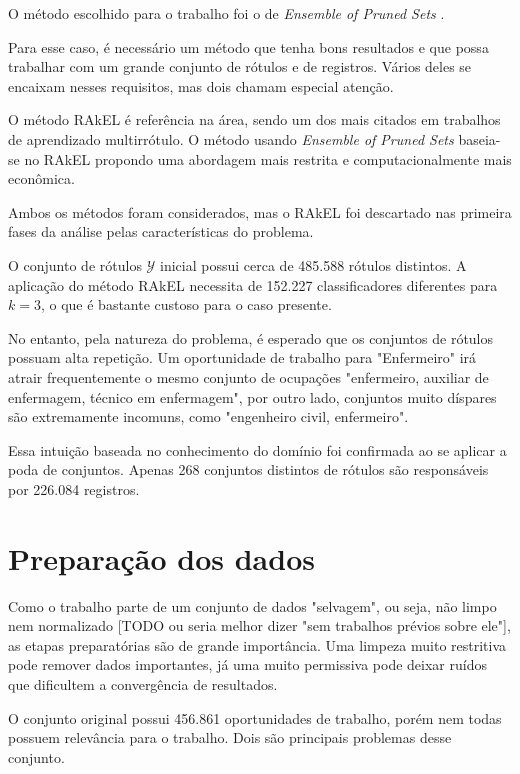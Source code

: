 \documentclass[runningheads,a4paper]{llncs}
\begin{document}
O método escolhido para o trabalho foi o de \textit{Ensemble of Pruned Sets} \cite{Read2008-bt}.

Para esse caso, é necessário um método que tenha bons resultados e que possa trabalhar com um grande conjunto de rótulos e de registros. Vários deles se encaixam nesses requisitos, mas dois chamam especial atenção.

O método RAkEL \cite{Tsoumakas2007-wm} é referência na área, sendo um dos mais citados em trabalhos de aprendizado multirrótulo. O método usando \textit{Ensemble of Pruned Sets} baseia-se no RAkEL propondo uma abordagem mais restrita e computacionalmente mais econômica.

Ambos os métodos foram considerados, mas o RAkEL foi descartado nas primeira fases da análise pelas características do problema.

O conjunto de rótulos $\mathcal{Y}$ inicial possui cerca de 485.588 rótulos distintos. A aplicação do método RAkEL \cite{Tsoumakas2007-wm} necessita de 152.227 classificadores diferentes para $k=3$, o que é bastante custoso para o caso presente.

No entanto, pela natureza do problema, é esperado que os conjuntos de rótulos possuam alta repetição. Um oportunidade de trabalho para "Enfermeiro" irá atrair frequentemente o mesmo conjunto de ocupações "enfermeiro, auxiliar de enfermagem, técnico em enfermagem", por outro lado, conjuntos muito díspares são extremamente incomuns, como "engenheiro civil, enfermeiro".

Essa intuição baseada no conhecimento do domínio foi confirmada ao se aplicar a poda de conjuntos. Apenas 268 conjuntos distintos de rótulos são responsáveis por 226.084 registros.

\section{Preparação dos dados} \label{sec:preparacao}

Como o trabalho parte de um conjunto de dados "selvagem", ou seja, não limpo nem normalizado [TODO ou seria melhor dizer "sem trabalhos prévios sobre ele"], as etapas preparatórias são de grande importância. Uma limpeza muito restritiva pode remover dados importantes, já uma muito permissiva pode deixar ruídos que dificultem a convergência de resultados.

O conjunto original possui 456.861 oportunidades de trabalho, porém nem todas possuem relevância para o trabalho. Dois são principais problemas desse conjunto.
\end{document}

